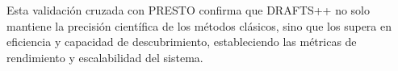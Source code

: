 Esta validación cruzada con PRESTO confirma que DRAFTS++ no solo mantiene la precisión científica de los métodos clásicos, sino que los supera en eficiencia y capacidad de descubrimiento, estableciendo las métricas de rendimiento y escalabilidad del sistema.



